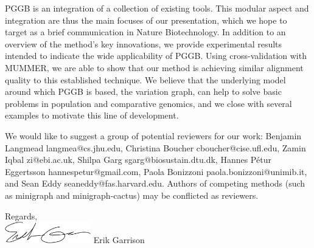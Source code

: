 \documentclass[12pt,hidelinks,letterpaper]{article}
\begin{document}
PGGB is an integration of a collection of existing tools.
This modular aspect and integration are thus the main focuses of our presentation, which we hope to target as a brief communication in Nature Biotechnology.
In addition to an overview of the method's key innovations, we provide experimental results intended to indicate the wide applicability of PGGB.
Using cross-validation with MUMMER, we are able to show that our method is achieving similar alignment quality to this established technique.
We believe that the underlying model around which PGGB is based, the variation graph, can help to solve basic problems in population and comparative genomics, and we close with several examples to motivate this line of development.

We would like to suggest a group of potential reviewers for our work: Benjamin Langmead langmea@cs.jhu.edu, Christina Boucher cboucher@cise.ufl.edu, Zamin Iqbal zi@ebi.ac.uk, Shilpa Garg sgarg@biosustain.dtu.dk, Hannes Pétur Eggertsson hannespetur@gmail.com, Paola Bonizzoni paola.bonizzoni@unimib.it, and Sean Eddy seaneddy@fas.harvard.edu.
Authors of competing methods (such as minigraph and minigraph-cactus) may be conflicted as reviewers.

\hfill \break
\indent Regards,\\
\hfill \break
\includegraphics[width=0.28\textwidth]{signature_Erik_Garrison.pdf}
\hfill \break
\indent Erik Garrison
\end{document}
